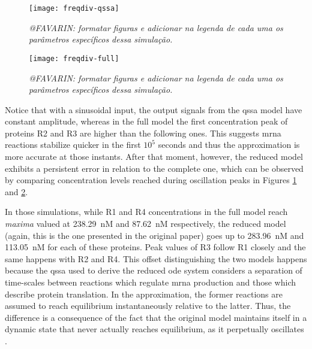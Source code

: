     \begin{figure}[!htbp]
      \centering
      \texttt{[image: freqdiv-qssa]}
      \caption{\textit{@FAVARIN: formatar figuras e adicionar na legenda de cada uma os parâmetros específicos dessa simulação.}}
      \label{fig.freqdiv-qssa}
    \end{figure}

    \begin{figure}[!htbp]
      \centering
      \texttt{[image: freqdiv-full]}
      \caption{\textit{@FAVARIN: formatar figuras e adicionar na legenda de cada uma os parâmetros específicos dessa simulação.}}
      \label{fig.freqdiv-full}
    \end{figure}

    Notice that with a sinusoidal input, the output signals from the \ac{qssa} model have constant amplitude, whereas in the full model the first concentration peak of proteins R2 and R3 are higher than the following ones.
    This suggests \acs{mrna} reactions stabilize quicker in the first $10^5$ seconds and thus the approximation is more accurate at those instants.
    After that moment, however, the reduced model exhibits a persistent error in relation to the complete one, which can be observed by comparing concentration levels reached during oscillation peaks in Figures \ref{fig.freqdiv-qssa} and \ref{fig.freqdiv-full}.

    In those simulations, while R1 and R4 concentrations in the full model reach \textit{maxima} valued at \SI{238.29}{\nano M} and \SI{87.62}{\nano M} respectively, the reduced model (again, this is the one presented in the original paper) goes up to \SI{283.96}{\nano M} and \SI{113.05}{\nano M} for each of these proteins.
    Peak values of R3 follow R1 closely and the same happens with R2 and R4.
    This offset distinguishing the two models happens because the \ac{qssa} used to derive the reduced \ac{ode} system considers a separation of time-scales between reactions which regulate \acs{mrna} production and those which describe protein translation.
    In the approximation, the former reactions are assumed to reach equilibrium instantaneously relative to the latter.
    Thus, the difference is a consequence of the fact that the original model maintains itself in a dynamic state that never actually reaches equilibrium, as it perpetually oscillates \cite{ingalls}.



